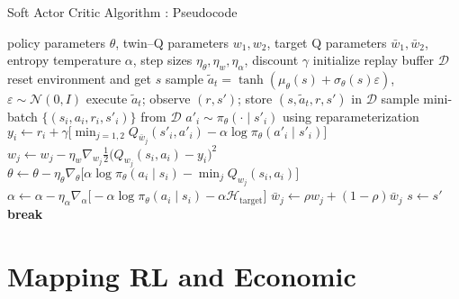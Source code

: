\documentclass{beamer}
\begin{document}
    \begin{frame}[fragile]{Soft Actor Critic Algorithm : Pseudocode}
      \vspace{-2}
      \begin{tcolorbox}
        \tiny
        \begin{algorithmic}[1]
          \Require policy parameters $\theta$, twin--Q parameters $w_1,w_2$,
                  target Q parameters $\bar w_1,\bar w_2$,
                  entropy temperature $\alpha$, step sizes $\eta_\theta,\eta_w,\eta_\alpha$, discount $\gamma$
          \State initialize replay buffer $\mathcal{D}$
            \State reset environment and get $s$
              \State sample $\tilde a_t = \tanh(\mu_\theta(s)+\sigma_\theta(s)\varepsilon)$, $\varepsilon\!\sim\!\mathcal{N}(0,I)$
              \State execute $\tilde a_t$; observe $(r,s')$; store $(s,\tilde a_t,r,s')$ in $\mathcal{D}$
                \State sample mini-batch $\{(s_i,a_i,r_i,s'_i)\}$ from $\mathcal{D}$
                \State $a'_i\!\sim\!\pi_\theta(\cdot\mid s'_i)$ using reparameterization
                \State $y_i \gets r_i+\gamma\bigl[\min_{j=1,2}Q_{\bar w_j}(s'_i,a'_i)-\alpha\log\pi_\theta(a'_i\mid s'_i)\bigr]$
                \State $w_j \gets w_j -\eta_w\nabla_{w_j}\frac12\bigl(Q_{w_j}(s_i,a_i)-y_i\bigr)^2$ 
                \State $\theta \gets \theta -\eta_\theta\nabla_\theta
                       \bigl[\alpha\log\pi_\theta(a_i\mid s_i)-\min_j Q_{w_j}(s_i,a_i)\bigr]$ 
                  \State $\alpha\gets\alpha-\eta_\alpha\nabla_\alpha
                         \bigl[-\alpha\log\pi_\theta(a_i\mid s_i)-\alpha\mathcal{H}_{\text{target}}\bigr]$
                \EndIf
                \State $\bar w_j\gets\rho w_j + (1-\rho)\bar w_j$ 
              \EndFor
              \State $s\gets s'$
               \textbf{break} \EndIf
            \EndFor
          \EndFor
        \end{algorithmic}
      \end{tcolorbox}
    \end{frame}

    

    

\section{Mapping RL and Economic}
\end{document}
